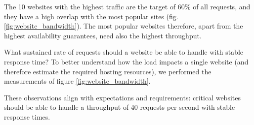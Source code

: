The 10 websites with the highest traffic are the target of 60\% of all requests, and they have a high overlap with the most popular sites (fig. \ref{fig:website_bandwidth}).
The most popular websites therefore, apart from the highest availability guarantees, need also the highest throughput.

What sustained rate of requests should a website be able to handle with stable response time?
To better understand how the load impacts a single website (and therefore estimate the required hosting resources),
we performed the measurements of figure \ref{fig:website_bandwidth}.

These observations align with expectations and requirements: critical websites should be able to handle a throughput of 40 requests per second with stable response times.